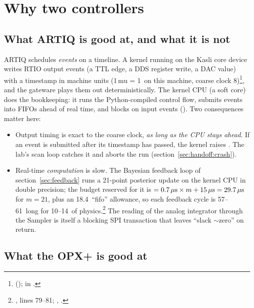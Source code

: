 \section{Why two controllers}
\label{sec:why}

\subsection{What ARTIQ is good at, and what it is not}

ARTIQ schedules \emph{events} on a timeline. A kernel running on the Kasli
core device writes RTIO output events (a TTL edge, a DDS register write, a
DAC value) with a timestamp in machine units (1\,mu = 1\nsu\ on this
machine, coarse clock 8\nsu)\footnote{
();  in
.}, and the gateware plays them out
deterministically. The kernel CPU (a soft core) does the bookkeeping: it
runs the Python-compiled control flow, submits events into FIFOs ahead of
real time, and blocks on input events (). Two consequences
matter here:

\begin{itemize}[nosep]
  \item Output timing is exact to the coarse clock, \emph{as long as the CPU
    stays ahead}. If an event is submitted after its timestamp has passed, the
    kernel raises . The lab's scan loop catches it and
    aborts the run (section~\ref{sec:handoff:crash}).
  \item Real-time \emph{computation} is slow. The Bayesian feedback loop of
    section~\ref{sec:feedback} runs a 21-point posterior update on the kernel
    CPU in double precision; the budget reserved for it is
     $= 0.7\,\mu\mathrm{s}\times m + 15\,\mu\mathrm{s} =
    29.7\,\mu\mathrm{s}$ for $m = 21$, plus an 18.4\us\ ``fifo'' allowance, so each
    feedback cycle is 57--61\us\ long for 10--14\us\ of physics.\footnote{,
    lines 79--81; , .}
    The reading of the analog integrator through the Sampler is itself a
    blocking SPI transaction that leaves ``slack $\sim$zero'' on return.
\end{itemize}

\subsection{What the OPX+ is good at}


